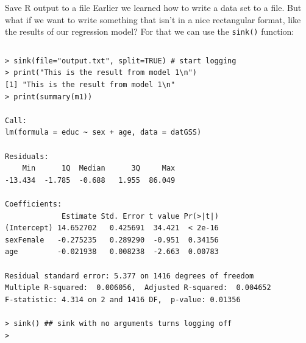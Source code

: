 \documentclass[table,smaller]{beamer}
\begin{document}
\begin{frame}[fragile,label=sec-6-6]{Save R output to a file}
 Earlier we learned how to write a data set to a file. But what if we want to write something that isn't in a nice rectangular format, like the results of our regression model? For that we can use the \verb~sink()~ function:

\vspace{-.5em}
\begin{columns}
\begin{block}{}
\begin{verbatim}
> sink(file="output.txt", split=TRUE) # start logging
> print("This is the result from model 1\n")
[1] "This is the result from model 1\n"
> print(summary(m1))

Call:
lm(formula = educ ~ sex + age, data = datGSS)

Residuals:
    Min      1Q  Median      3Q     Max 
-13.434  -1.785  -0.688   1.955  86.049 

Coefficients:
             Estimate Std. Error t value Pr(>|t|)
(Intercept) 14.652702   0.425691  34.421  < 2e-16
sexFemale   -0.275235   0.289290  -0.951  0.34156
age         -0.021938   0.008238  -2.663  0.00783

Residual standard error: 5.377 on 1416 degrees of freedom
Multiple R-squared:  0.006056,	Adjusted R-squared:  0.004652 
F-statistic: 4.314 on 2 and 1416 DF,  p-value: 0.01356

> sink() ## sink with no arguments turns logging off
>
\end{verbatim}
\end{block}
\end{columns}
\vspace{.5em}
\end{frame}
\end{document}

